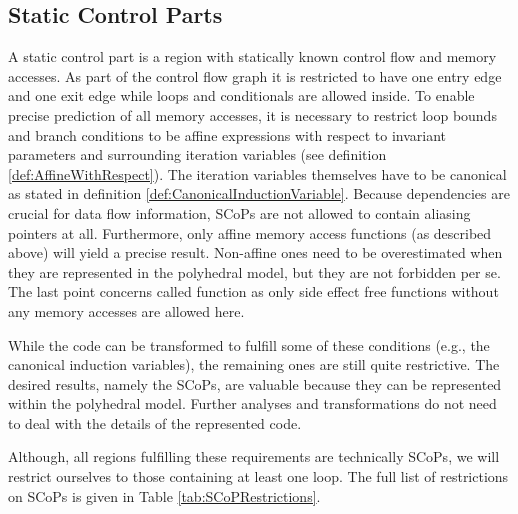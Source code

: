 \subsection{Static Control Parts}
\label{SCoPs}
A static control part is a region with statically known control flow and memory
accesses. As part of the control flow graph it is restricted to have one entry
edge and one exit edge while loops and conditionals are allowed inside.
To enable precise  prediction of all memory accesses, 
it is necessary to restrict loop bounds and branch 
conditions to be affine expressions with respect to invariant parameters 
and surrounding iteration variables (see definition \ref{def:AffineWithRespect}).
The iteration variables themselves have to
be canonical as stated in definition \ref{def:CanonicalInductionVariable}. 
Because dependencies are crucial for data flow information,
SCoPs are not allowed to contain aliasing pointers at all. 
Furthermore, only affine memory access functions (as described above)
will yield a precise result. Non-affine ones need to be overestimated when they 
are represented in the polyhedral model, but they are not forbidden per se.
The last point concerns called function as only side effect free functions without 
any memory accesses are allowed here. 

While the code can be transformed to fulfill some of these conditions 
(e.g., the canonical induction variables), the remaining ones are still 
quite restrictive. The desired results, namely the SCoPs, are valuable because
they can be represented within the polyhedral model. Further analyses and
transformations do not need to deal with the details of the represented code.

Although, all regions fulfilling these requirements are
technically SCoPs, we will restrict ourselves to those containing at least one loop.
The full list of restrictions on SCoPs is given in Table \ref{tab:SCoPRestrictions}.

